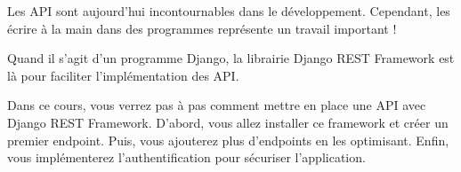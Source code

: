 Les API sont aujourd’hui incontournables dans le développement. Cependant, les écrire à la main dans des programmes représente un travail important !

Quand il s’agit d’un programme Django, la librairie Django REST Framework est là pour faciliter l’implémentation des API.

Dans ce cours, vous verrez pas à pas comment mettre en place une API avec Django REST Framework. D’abord, vous allez installer ce framework et créer un premier endpoint. Puis, vous ajouterez plus d’endpoints en les optimisant. Enfin, vous implémenterez l’authentification pour sécuriser l’application.